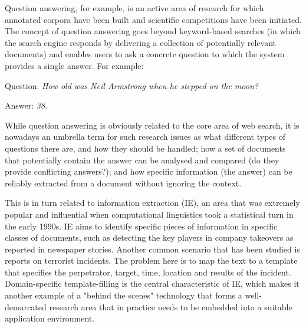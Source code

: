 \begin{multicols}{2}
Question answering, for example, is an active area of research for which annotated corpora have been built and scientific competitions have been initiated. The concept of question answering goes beyond keyword-based searches (in which the search engine responds by delivering a collection of potentially relevant documents) and enables users to ask a concrete question to which the system provides a single answer. For example:

\hspace{0.5cm}Question: {\it How old was Neil Armstrong when he stepped on the moon?}

\hspace{0.5cm}Answer: {\it 38.}

While question answering is obviously related to the core area of web search, it is nowadays an umbrella term for such research issues as what different types of questions there are, and how they should be handled; how a set of documents that potentially contain the answer can be analysed and compared (do they provide conflicting answers?); and how specific information (the answer) can be reliably extracted from a document without ignoring the context. 

This is in turn related to information extraction (IE), an area that was extremely popular and influential when computational linguistics took a statistical turn in the early 1990s. IE aims to identify specific pieces of information in specific classes of documents, such as detecting the key players in company takeovers as reported in newspaper stories. Another common scenario that has been studied is reports on terrorist incidents. The problem here is to map the text to a template that specifies the perpetrator, target, time, location and results of the incident. Domain-specific template-filling is the central characteristic of IE, which makes it another example of a "behind the scenes" technology that forms a well-demarcated research area that in practice needs to be embedded into a suitable application environment. 


\end{multicols}
